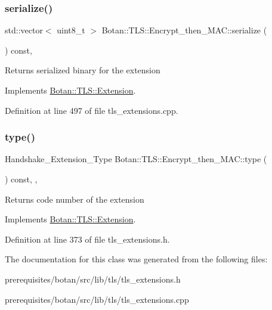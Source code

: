 \subsubsection{\texorpdfstring{serialize()}{serialize()}}
{\footnotesize\ttfamily std\+::vector$<$ uint8\+\_\+t $>$ Botan\+::\+T\+L\+S\+::\+Encrypt\+\_\+then\+\_\+\+M\+A\+C\+::serialize (\begin{DoxyParamCaption}{ }\end{DoxyParamCaption}) const\hspace{0.3cm}{\ttfamily [override]}, {\ttfamily [virtual]}}

\begin{DoxyReturn}{Returns}
serialized binary for the extension 
\end{DoxyReturn}


Implements \mbox{\hyperlink{class_botan_1_1_t_l_s_1_1_extension_a56788726ad2526db54e5a26039cb69db}{Botan\+::\+T\+L\+S\+::\+Extension}}.



Definition at line 497 of file tls\+\_\+extensions.\+cpp.

\mbox{\label{class_botan_1_1_t_l_s_1_1_encrypt__then___m_a_c_a56854b4e65b0cf1395b3b053df42f4f3}} 
\subsubsection{\texorpdfstring{type()}{type()}}
{\footnotesize\ttfamily Handshake\+\_\+\+Extension\+\_\+\+Type Botan\+::\+T\+L\+S\+::\+Encrypt\+\_\+then\+\_\+\+M\+A\+C\+::type (\begin{DoxyParamCaption}{ }\end{DoxyParamCaption}) const\hspace{0.3cm}{\ttfamily [inline]}, {\ttfamily [override]}, {\ttfamily [virtual]}}

\begin{DoxyReturn}{Returns}
code number of the extension 
\end{DoxyReturn}


Implements \mbox{\hyperlink{class_botan_1_1_t_l_s_1_1_extension_ac8819b312ce604453225e7b4f7c373ec}{Botan\+::\+T\+L\+S\+::\+Extension}}.



Definition at line 373 of file tls\+\_\+extensions.\+h.



The documentation for this class was generated from the following files\+:\begin{DoxyCompactItemize}
\item 
prerequisites/botan/src/lib/tls/tls\+\_\+extensions.\+h\item 
prerequisites/botan/src/lib/tls/tls\+\_\+extensions.\+cpp\end{DoxyCompactItemize}
